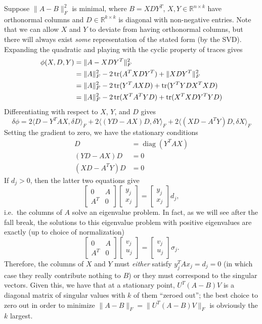 \documentclass[12pt, leqno]{article} %
\begin{document}
Suppose $\|A-B\|_F^2$ is minimal, where $B = XDY^T$,
$X, Y \in \mathbb{R}^{n \times k}$ have orthonormal columns and
$D \in \mathbb{R}^{k \times k}$ is diagonal with non-negative entries.
Note that we can allow $X$ and $Y$ to deviate from having orthonormal
columns, but there will always exist {\em some} representation of
the stated form (by the SVD).
Expanding the quadratic and playing with the cyclic property of
traces gives
\begin{align*}
  \phi(X, D, Y)
  &= \|A-XDY^T\|_F^2 \\
  &= \|A\|_F^2 - 2 \operatorname{tr}(A^T X D Y^T) + \|XDY^T\|_F^2 \\
  &= \|A\|_F^2 - 2 \operatorname{tr}(Y^T A X D) + \operatorname{tr}(Y^T Y D X^T X D) \\
  &= \|A\|_F^2 - 2 \operatorname{tr}(X^T A^T Y D) + \operatorname{tr}(X^T X D Y^T Y D)
\end{align*}
Differentiating with respect to $X$, $Y$, and $D$ gives
\[
\delta \phi = 
2 \langle D-Y^T A X, \delta D \rangle_F +
2 \langle (YD-AX) D, \delta Y \rangle_F +
2 \langle (XD-A^T Y) D, \delta X \rangle_F
\]
Setting the gradient to zero, we have the stationary conditions
\begin{align*}
  D &= \operatorname{diag}(Y^T A X) \\
  (YD-AX) D &= 0 \\
  (XD-A^T Y) D &= 0 
\end{align*}
If $d_j > 0$, then the latter two equations give
\[
\begin{bmatrix} 0 & A \\ A^T & 0 \end{bmatrix}
\begin{bmatrix} y_j \\ x_j \end{bmatrix} =
\begin{bmatrix} y_j \\ x_j \end{bmatrix} d_j,
\]
i.e.~the columns of $A$ solve an eigenvalue problem.  In fact, as we
will see after the fall break, the solutions to this eigenvalue
problem with positive eigenvalues are exactly (up to choice of normalization)
\[
  \begin{bmatrix} 0 & A \\ A^T & 0 \end{bmatrix}
  \begin{bmatrix} v_j \\ u_j \end{bmatrix} =
  \begin{bmatrix} v_j \\ u_j \end{bmatrix} \sigma_j.
\]
Therefore, the columns of $X$ and $Y$ must {\em either} satisfy $y_j^T
A x_j = d_j = 0$ (in which case they really contribute nothing to $B$)
or they must correspond to the singular vectors.  Given this, we have
that at a stationary point,
$U^T (A-B) V$ is a diagonal matrix of singular values with $k$ of them
``zeroed out''; the best choice to zero out in order to minimize
$\|A-B\|_F = \|U^T (A-B) V\|_F$ is obviously the $k$ largest.
\end{document}
